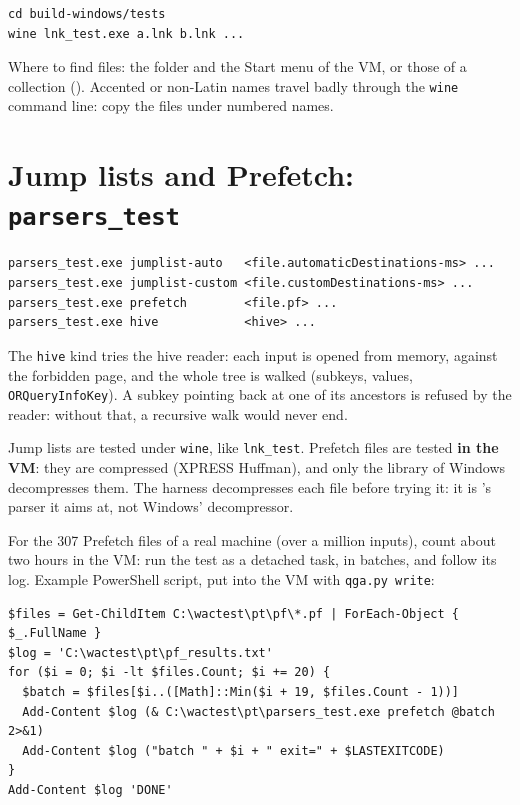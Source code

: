 \documentclass[11pt,a4paper,oneside]{report}
\begin{document}
\begin{lstlisting}
cd build-windows/tests
wine lnk_test.exe a.lnk b.lnk ...
\end{lstlisting}

Where to find files: the  folder and the Start menu of the VM,
or those of a collection (). Accented or non-Latin
names travel badly through the \texttt{wine} command line: copy the files under
numbered names.

\section{Jump lists and Prefetch: \texttt{parsers\_test}}\label{sec:parsers}

\begin{lstlisting}
parsers_test.exe jumplist-auto   <file.automaticDestinations-ms> ...
parsers_test.exe jumplist-custom <file.customDestinations-ms> ...
parsers_test.exe prefetch        <file.pf> ...
parsers_test.exe hive            <hive> ...
\end{lstlisting}

The \texttt{hive} kind tries the hive reader: each input is opened from memory,
against the forbidden page, and the whole tree is walked (subkeys, values,
\texttt{ORQueryInfoKey}). A subkey pointing back at one of its ancestors is
refused by the reader: without that, a recursive walk would never end.

Jump lists are tested under \texttt{wine}, like \texttt{lnk\_test}. Prefetch files
are tested \textbf{in the VM}: they are compressed (XPRESS Huffman), and only the
 library of Windows decompresses them. The harness decompresses
each file before trying it: it is \wac{}'s parser it aims at, not Windows'
decompressor.

For the 307 Prefetch files of a real machine (over a million inputs), count about
two hours in the VM: run the test as a detached task, in batches, and follow its
log. Example PowerShell script, put into the VM with \texttt{qga.py write}:

\begin{lstlisting}
$files = Get-ChildItem C:\wactest\pt\pf\*.pf | ForEach-Object { $_.FullName }
$log = 'C:\wactest\pt\pf_results.txt'
for ($i = 0; $i -lt $files.Count; $i += 20) {
  $batch = $files[$i..([Math]::Min($i + 19, $files.Count - 1))]
  Add-Content $log (& C:\wactest\pt\parsers_test.exe prefetch @batch 2>&1)
  Add-Content $log ("batch " + $i + " exit=" + $LASTEXITCODE)
}
Add-Content $log 'DONE'
\end{lstlisting}
\end{document}
